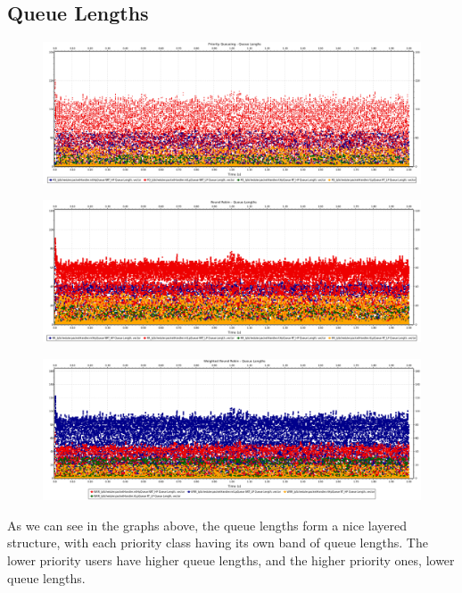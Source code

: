 \documentclass[12pt]{article}
\begin{document}
        \subsection{Queue Lengths}
        \begin{figure}[htbp!]
            \centering
            \includegraphics[width=\textwidth]{images/PriorityQueueing_qule.png}
        \end{figure}
        \begin{figure}[htbp!]
            \centering
            \includegraphics[width=\textwidth]{images/RoundRobin_qule.png}
        \end{figure}
        \begin{figure}[htbp!]
            \centering
            \includegraphics[width=\textwidth]{images/WeightedRoundRobin_qule.png}
        \end{figure}
        \pagebreak
        As we can see in the graphs above, the queue lengths form a nice layered structure, with each priority class having its own band of queue lengths. The lower priority users have higher queue lengths, and the higher priority ones, lower queue lengths.
        
\end{document}
